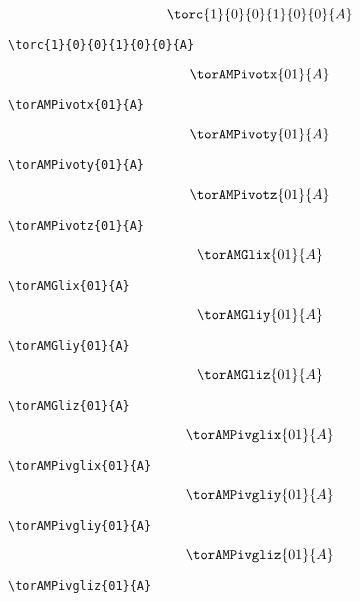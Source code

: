 \documentclass[a4paper,9pt]{article}
\begin{document}
$$\torc{1}{0}{0}{1}{0}{0}{A}$$
\begin{verbatim}
\torc{1}{0}{0}{1}{0}{0}{A}
\end{verbatim}
$$\torAMPivotx{01}{A}$$
\begin{verbatim}
\torAMPivotx{01}{A}
\end{verbatim}
$$\torAMPivoty{01}{A}$$
\begin{verbatim}
\torAMPivoty{01}{A}
\end{verbatim}
$$\torAMPivotz{01}{A}$$
\begin{verbatim}
\torAMPivotz{01}{A}
\end{verbatim}
$$\torAMGlix{01}{A}$$
\begin{verbatim}
\torAMGlix{01}{A}
\end{verbatim}
$$\torAMGliy{01}{A}$$
\begin{verbatim}
\torAMGliy{01}{A}
\end{verbatim}
$$\torAMGliz{01}{A}$$
\begin{verbatim}
\torAMGliz{01}{A}
\end{verbatim}
$$\torAMPivglix{01}{A}$$
\begin{verbatim}
\torAMPivglix{01}{A}
\end{verbatim}
$$\torAMPivgliy{01}{A}$$
\begin{verbatim}
\torAMPivgliy{01}{A}
\end{verbatim}
$$\torAMPivgliz{01}{A}$$
\begin{verbatim}
\torAMPivgliz{01}{A}
\end{verbatim}
\end{document}
